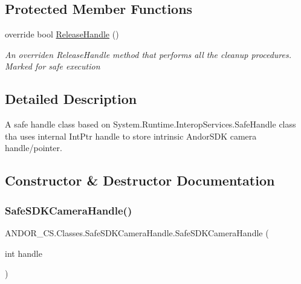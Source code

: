 \subsection*{Protected Member Functions}
\begin{DoxyCompactItemize}
\item 
override bool \hyperlink{class_a_n_d_o_r___c_s_1_1_classes_1_1_safe_s_d_k_camera_handle_a9b41a751d60b07980cce41324e2e6420}{Release\+Handle} ()
\begin{DoxyCompactList}\small\item\em An overriden Release\+Handle method that performs all the cleanup procedures. Marked for safe execution \end{DoxyCompactList}\end{DoxyCompactItemize}


\subsection{Detailed Description}
A safe handle class based on System.\+Runtime.\+Interop\+Services.\+Safe\+Handle class tha uses internal Int\+Ptr handle to store intrinsic Andor\+S\+DK camera handle/pointer. 



\subsection{Constructor \& Destructor Documentation}
\mbox{\label{class_a_n_d_o_r___c_s_1_1_classes_1_1_safe_s_d_k_camera_handle_a08cb65cbcc8a50bcd712aff0cb0c2e2b}} 
\subsubsection{\texorpdfstring{Safe\+S\+D\+K\+Camera\+Handle()}{SafeSDKCameraHandle()}}
{\footnotesize\ttfamily A\+N\+D\+O\+R\+\_\+\+C\+S.\+Classes.\+Safe\+S\+D\+K\+Camera\+Handle.\+Safe\+S\+D\+K\+Camera\+Handle (\begin{DoxyParamCaption}\item[{int}]{handle }\end{DoxyParamCaption})}



